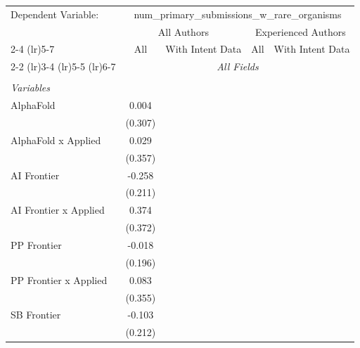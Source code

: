 \begingroup
\centering
\begin{tabular}{lcccccc}
   \tabularnewline \midrule \midrule
   Dependent Variable: & \multicolumn{6}{c}{num\_primary\_submissions\_w\_rare\_organisms}\\
 & \multicolumn{3}{c}{All Authors} & \multicolumn{3}{c}{Experienced Authors} \\
\cmidrule(lr){2-4} \cmidrule(lr){5-7}
 & \multicolumn{1}{c}{All} & \multicolumn{2}{c}{With Intent Data} & \multicolumn{1}{c}{All} & \multicolumn{2}{c}{With Intent Data} \\
\cmidrule(lr){2-2} \cmidrule(lr){3-4} \cmidrule(lr){5-5} \cmidrule(lr){6-7}
 & \multicolumn{6}{c}{\textit{All Fields}} \\ \\
   \emph{Variables}\\
   AlphaFold             & 0.004         &           &           &        &        &   \\   
                         & (0.307)       &           &           &        &        &   \\   
   AlphaFold x Applied   & 0.029         &           &           &        &        &   \\   
                         & (0.357)       &           &           &        &        &   \\   
   AI Frontier           & -0.258        &           &           &        &        &   \\   
                         & (0.211)       &           &           &        &        &   \\   
   AI Frontier x Applied & 0.374         &           &           &        &        &   \\   
                         & (0.372)       &           &           &        &        &   \\   
   PP Frontier           & -0.018        &           &           &        &        &   \\   
                         & (0.196)       &           &           &        &        &   \\   
   PP Frontier x Applied & 0.083         &           &           &        &        &   \\   
                         & (0.355)       &           &           &        &        &   \\   
   SB Frontier           & -0.103        &           &           &        &        &   \\   
                         & (0.212)       &           &           &        &        &   \\   

\end{tabular}
